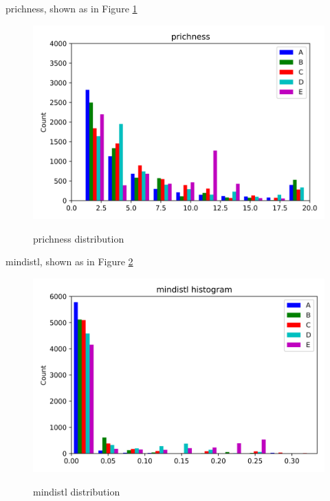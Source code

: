 \documentclass{article}
\begin{document}
prichness, shown as in Figure \ref{prichness}
\begin{figure}[htbp]
	\centering
	\includegraphics[width=\textwidth, keepaspectratio]{prichness.png}\\
	\caption{prichness distribution}
	\label{prichness}
\end{figure}


mindistl, shown as in Figure \ref{mindistl}
\begin{figure}[htbp]
	\centering
	\includegraphics[width=\textwidth, keepaspectratio]{mindistl.png}\\
	\caption{mindistl distribution}
	\label{mindistl}
\end{figure}
\end{document}
